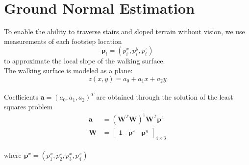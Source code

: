 \documentclass{article}
\begin{document}
\section{Ground Normal Estimation}
To enable the ability to traverse stairs and sloped terrain without vision, we use
measurements of each footstep location $$\boldsymbol{p}_i=(p^{x}_i, p^{y}_i, p^{z}_i)$$
to approximate the local slope of the walking surface.
\\
The walking surface is modeled as a plane:
$$
z(x, y)=a_{0}+a_{1} x+a_{2} y
$$
\\
Coefficients $\boldsymbol{a}=\left(a_{0}, a_{1}, a_{2}\right)^{T}$ are obtained through the solution of the least squares problem
$$
\begin{aligned}
\boldsymbol{a} &=\left(\boldsymbol{W}^{T} \boldsymbol{W}\right)^{\dagger} \boldsymbol{W}^{T} \boldsymbol{p}^{z} \\
\boldsymbol{W} &=\left[\begin{array}{lll}
\mathbf{1} & \boldsymbol{p}^{x} & \boldsymbol{p}^{y}
\end{array}\right]_{4 \times 3}
\end{aligned}
$$
\\
where $\boldsymbol{p}^{x}=(p^{x}_1, p^{x}_2, p^{x}_3, p^{x}_4)$
\end{document}
